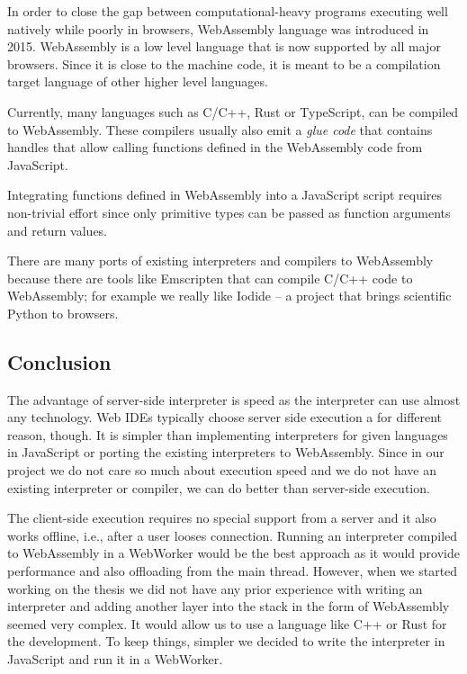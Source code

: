 In order to close the gap between computational-heavy programs executing well natively while poorly in browsers, WebAssembly
language was introduced in 2015. WebAssembly is a low level language that is now supported by all major browsers. Since it is
close to the machine code, it is meant to be a compilation target language of other higher level languages.

Currently, many languages such as C/C++, Rust or TypeScript, can be compiled to WebAssembly. These compilers usually also emit
a \emph{glue code} that contains handles that allow calling functions defined in the WebAssembly code from JavaScript.

Integrating functions defined in WebAssembly into a JavaScript script requires non-trivial effort since only primitive types can be passed
as function arguments and return values.

There are many ports of existing interpreters and compilers to WebAssembly because there are tools like Emscripten \cite{Emscripten}
that can compile C/C++ code to WebAssembly; for example we really like Iodide \cite{Iodide} -- a project that brings scientific Python
to browsers.

\subsection{Conclusion}
The advantage of server-side interpreter is speed as the interpreter can use almost any technology. Web IDEs typically choose
server side execution a for different reason, though. It is simpler than implementing interpreters for given languages in JavaScript or
porting the existing interpreters to WebAssembly. Since in our project we do not care so much about execution speed and
we do not have an existing interpreter or compiler, we can do better than server-side execution.

The client-side execution requires no special support from a server and it also works offline, i.e., after a user looses connection. Running an interpreter
compiled to WebAssembly in a WebWorker would be the best approach as it would provide performance and also offloading from the main thread.
However, when we started working on the thesis we did not have any prior experience with writing an interpreter and adding another layer into the stack in the
form of WebAssembly seemed very complex. It would allow us to use a language like C++ or Rust for the development. To keep things, simpler we
decided to write the interpreter in JavaScript and run it in a WebWorker.

